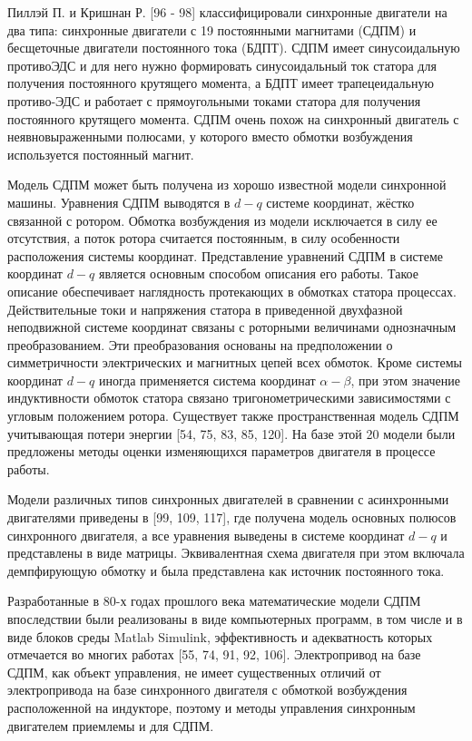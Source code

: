 Пиллэй П. и Кришнан Р. [96 - 98] классифицировали синхронные двигатели на два типа: синхронные двигатели с 19 постоянными магнитами (СДПМ) и бесщеточные двигатели постоянного тока (БДПТ). СДПМ имеет синусоидальную противоЭДС и для него нужно формировать синусоидальный ток статора для получения постоянного крутящего момента, а БДПТ имеет трапецеидальную противо-ЭДС и работает с прямоугольными токами статора для получения постоянного крутящего момента. СДПМ очень похож на синхронный двигатель с неявновыраженными полюсами, у которого вместо обмотки возбуждения используется постоянный магнит.

Модель СДПМ может быть получена из хорошо известной модели синхронной машины. Уравнения СДПМ выводятся в $d-q$ системе координат, жёстко связанной с ротором. Обмотка возбуждения из модели исключается в силу ее отсутствия, а поток ротора считается постоянным, в силу особенности расположения системы координат. 
Представление уравнений СДПМ в системе координат $d-q$ является основным способом описания его работы. Такое описание обеспечивает наглядность протекающих в обмотках статора процессах. Действительные токи и напряжения статора в приведенной двухфазной неподвижной системе координат связаны с роторными величинами однозначным преобразованием. Эти преобразования основаны на предположении о симметричности электрических и магнитных цепей всех обмоток. Кроме системы координат $d-q$ иногда применяется система координат $\alpha-\beta$, при этом значение индуктивности обмоток статора связано тригонометрическими зависимостями с угловым положением ротора. 
Существует также пространственная модель СДПМ учитывающая потери энергии [54, 75, 83, 85, 120]. На базе этой 20 модели были предложены методы оценки изменяющихся параметров двигателя в процессе работы. 

Модели различных типов синхронных двигателей в сравнении с асинхронными двигателями приведены в [99, 109, 117], где получена модель основных полюсов синхронного двигателя, а все уравнения выведены в системе координат $d-q$ и представлены в виде матрицы. Эквивалентная схема двигателя при этом включала демпфирующую обмотку и была представлена как источник постоянного тока. 

Разработанные в 80-х годах прошлого века математические модели СДПМ впоследствии были реализованы в виде компьютерных программ, в том числе и в виде блоков среды Matlab Simulink, эффективность и адекватность которых отмечается во многих работах [55, 74, 91, 92, 106]. 
Электропривод на базе СДПМ, как объект управления, не имеет существенных отличий от электропривода на базе синхронного двигателя с обмоткой возбуждения расположенной на индукторе, поэтому и методы управления синхронным двигателем приемлемы и для СДПМ.
 
